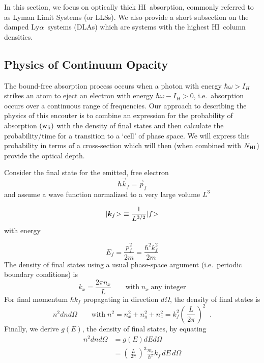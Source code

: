 \documentclass[graybox]{svmult}
\newcommand{\HI}{H{\sc I}}
\def\lya{Ly$\alpha$}
\def\ket#1{{|#1\negmedspace>}}
\def\ltp{\left ( \,}
\def\rtp{\, \right  ) }
\newcommand{\mnhi}{N_{\rm HI}}
\newcommand{\nhi}{$\mnhi$}
\begin{document}
In this section, we focus on optically thick \HI\ absorption,
commonly referred to as Lyman Limit Systems (or LLSs).  We also
provide a short subsection on the damped \lya\ systems (DLAs)
which are systems with the highest \HI\ column densities.

\subsection{Physics of Continuum Opacity}

The bound-free absorption process occurs when a  
photon with energy $\hbar \omega > I_H$ strikes an atom 
to eject an electron with energy $\hbar\omega - I_H > 0$,
i.e.\ absorption occurs over a continuous range of frequencies.
Our approach to describing the physics of this encouter
is to combine an expression for the probability of absorption
$({\rm w_{fi}})$ with the density of final states
and then calculate the probability/time for a transition to a 
`cell' of phase space.
We will express this probability in terms of a cross-section
which will then (when combined with \nhi)
provide the optical depth.

Consider the final state for the emitted, free electron
\begin{equation}
\hbar \vec k_f = \vec p_f
\end{equation}
and	assume a wave function normalized to a very large volume $L^3$

\begin{equation}
\ket{\vec k_f} \equiv \frac{1}{L^{3/2}} \ket{f}
\end{equation}
with energy  

\begin{equation}
E_f = \frac{p_f^2}{2m} = \frac{\hbar^2 k_f^2}{2m}
\end{equation}
The density of final states using
a usual phase-space argument (i.e.\ periodic boundary conditions) is
\begin{equation}
k_x = \frac{2\pi n_x}{L} \quad\quad \text{with} \; n_x \; 
\text{any integer}
\end{equation}
For final momentum $\hbar k_f$ propagating in direction $d\Omega$, 
the density of final states is
\begin{equation}
n^2 dn d\Omega \quad\quad \text{with} \; n^2 = n_x^2 + n_y^2 + n_z^2 =
k_f^2 \ltp \frac{L}{2\pi} \rtp^2 \;\; .
\end{equation}
Finally, we derive $g(E)$, the density of final states, by
equating
\begin{equation}
\begin{split}
	n^2 dn d\Omega &= g(E) dE d\Omega \\
	               &= \ltp \frac{L}{2\pi} \rtp^3 \frac{m_e}{\hbar^2} k_f 
		         \, dE \, d\Omega\\
\end{split}
\end{equation}
\end{document}
